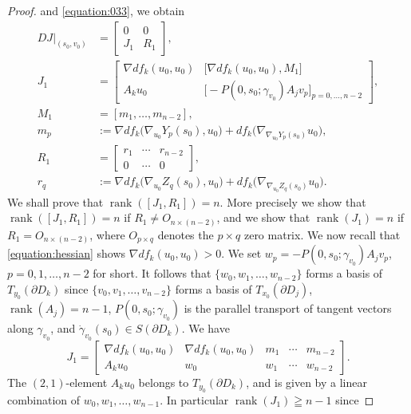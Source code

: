 \documentclass[a4paper,11pt,reqno]{amsart}
\numberwithin{equation}{section}
\theoremstyle{definition}
\theoremstyle{remark}
\begin{document}
\begin{proof}
and 
\eqref{equation:033}, 
we obtain 
%
%
\begin{align*}
  DJ\vert_{(s_0,v_0)}
& =
  \begin{bmatrix}
  0 & 0
  \\
  J_1 & R_1
  \end{bmatrix},
\\
  J_1
& =
  \begin{bmatrix}
  \nabla{df_k}(u_0,u_0) 
  & 
  \bigl[\nabla{df_k}(u_0,u_0),M_1\bigr]
  \\
  A_ku_0 
  &
  \bigl[-P(0,s_0;\gamma_{v_0})A_jv_p\bigr]_{p=0,\dotsc,n-2}
  \end{bmatrix},
\\
  M_1
& =
  [m_1,\dotsc,m_{n-2}],
\\
  m_p
& :=
  {\nabla}df_k\bigl(\nabla_{u_0}Y_p(s_0),u_0\bigr)
  +
  df_k\bigl(\nabla_{\nabla_{u_0}Y_p(s_0)}u_0\bigr),
\\
  R_1
& =
  \begin{bmatrix}
  r_1 & \dotsb & r_{n-2}
  \\
  0 & \dotsb & 0 
  \end{bmatrix},
\\
  r_q
& :=
  {\nabla}df_k\bigl(\nabla_{u_0}Z_q(s_0),u_0\bigr)
  +
  df_k\bigl(\nabla_{\nabla_{u_0}Z_q(s_0)}u_0\bigr).
\end{align*}
%
%
We shall prove that $\operatorname{rank}([J_1,R_1])=n$. 
More precisely 
we show that $\operatorname{rank}([J_1,R_1])=n$ 
if $R_1\ne{O_{n\times(n-2)}}$, 
and we show that $\operatorname{rank}(J_1)=n$ if $R_1=O_{n\times(n-2)}$, 
where $O_{p{\times}q}$ denotes the $p{\times}q$ zero matrix. 
We now recall that \eqref{equation:hessian} shows ${\nabla}df_k(u_0,u_0)>0$. 
We set $w_p=-P(0,s_0;\gamma_{v_0})A_jv_p$, $p=0,1,\dotsc,n-2$ for short. 
It follows that $\{w_0,w_1,\dotsc,w_{n-2}\}$ 
forms a basis of $T_{y_0}(\partial{D_k})$ 
since 
$\{v_0,v_1,\dotsc,v_{n-2}\}$ 
forms a basis of $T_{x_0}(\partial{D_j})$, 
$\operatorname{rank}(A_j)=n-1$, 
$P(0,s_0;\gamma_{v_0})$ is the parallel transport of tangent vectors along $\gamma_{v_0}$, 
and 
$\dot{\gamma}_{v_0}(s_0) \in S(\partial{D_k})$. We have 
%
%
$$
J_1
=
\begin{bmatrix}
\nabla{df_k}(u_0,u_0) 
& 
\nabla{df_k}(u_0,u_0)
&
m_1
& 
\dotsb 
& 
m_{n-2}
\\
A_ku_0 
&
w_0
&
w_1
&
\dotsb
&
w_{n-2}
\end{bmatrix}.
$$
%
%
The $(2,1)$-element $A_ku_0$ belongs to $T_{y_0}(\partial{D_k})$, 
and is given by a linear combination of $w_0,w_1,\dotsc,w_{n-1}$. 
In particular $\operatorname{rank}(J_1) \geqq n-1$ since 

\end{proof}
\end{document}
